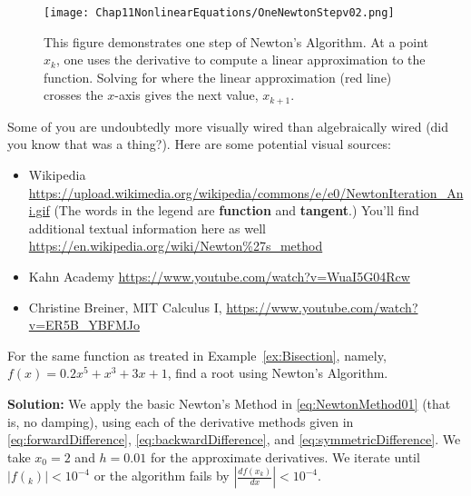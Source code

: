 \vspace*{.2cm}



\begin{figure}[hbt]%
    \centering
    \texttt{[image: Chap11NonlinearEquations/OneNewtonStepv02.png]}
\caption[]{This figure demonstrates one step of Newton's Algorithm. At a point $x_k$, one uses the derivative to compute a linear approximation to the function. Solving for where the linear approximation (red line) crosses the $x$-axis gives the next value, $x_{k+1}$.}
\label{fig:NewtonOneStep}%
\end{figure}

\vspace*{.2cm}
\begin{tcolorbox}[title=\textbf{Visual Representation of Newton's Algorithm}]
Some of you are undoubtedly more visually wired than algebraically wired (did you know that was a thing?). Here are some potential visual sources:
\begin{itemize}
    \item Wikipedia \url{https://upload.wikimedia.org/wikipedia/commons/e/e0/NewtonIteration_Ani.gif} (The words in the legend are \textbf{function} and \textbf{tangent}.) You'll find additional textual information here as well \url{https://en.wikipedia.org/wiki/Newton%27s_method}
    \item Kahn Academy \url{https://www.youtube.com/watch?v=WuaI5G04Rcw}
    \item Christine Breiner, MIT Calculus I,  \url{https://www.youtube.com/watch?v=ER5B_YBFMJo}
\end{itemize}

\end{tcolorbox}


\vspace*{.2cm}

\begin{example}
\label{ex:NewtonMethod}
For the same function as treated in Example~\ref{ex:Bisection}, namely, $f(x)=0.2x^5  + x^3 + 3x + 1$, find a root using Newton's Algorithm. 

\end{example}

\textbf{Solution:} We apply the basic Newton's Method in \eqref{eq:NewtonMethod01} (that is, no damping), using each of the derivative methods given in \eqref{eq:forwardDifference}, 
\eqref{eq:backwardDifference}, and \eqref{eq:symmetricDifference}. We take $x_0=2$ and $h = 0.01$ for the approximate derivatives. We iterate until $|f(_k)| < 10^{-4}$ or the algorithm fails by $\left| \frac{df(x_k)}{dx} \right| < 10^{-4}$.\\

